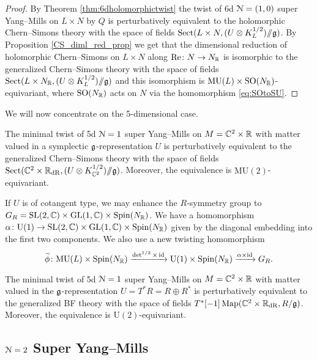 \documentclass[10pt, oneside]{article}
\newcommand{\MU}{\mathrm{MU}}
\renewcommand{\Re}{\mathrm{Re}}
\newcommand{\Sect}{\mathrm{Sect}}
\renewcommand{\U}{\mathrm{U}}
\newcommand{\ham}{/\!\!/}
\begin{document}
\begin{proof}
By Theorem \ref{thm:6dholomorphictwist} the twist of 6d $\mathcal N=(1, 0)$ super Yang--Mills on $L\times N$ by $Q$ is perturbatively equivalent to the holomorphic Chern--Simons theory with the space of fields $\Sect(L\times N, (U\otimes K_L^{1/2})\ham \fg)$. By Proposition \ref{CS_diml_red_prop} we get that the dimensional reduction of holomorphic Chern--Simons on $L\times N$ along $\Re\colon N\rightarrow N_\RR$ is isomorphic to the generalized Chern--Simons theory with the space of fields $\Sect(L\times N_\RR, (U\otimes K_L^{1/2})\ham\fg)$ and this isomorphism is $\MU(L)\times \SO(N_\RR)$-equivariant, where $\mathrm{SO}(N_\mathbb R)$ acts on $N$ via the homomorphism \eqref{eq:SOtoSU}.
\end{proof}

We will now concentrate on the 5-dimensional case.

\begin{theorem}
The minimal twist of 5d $\mathcal N=1$ super Yang--Mills on $M=\mathbb C^2\times \mathbb R$ with matter valued in a symplectic $\mathfrak g$-representation $U$ is perturbatively equivalent to the generalized Chern--Simons theory with the space of fields $\Sect(\CC^2\times \RR_{\mathrm{dR}}, (U\otimes K_{\CC^2}^{1/2})\ham \fg)$. Moreover, the equivalence is $\MU(2)$-equivariant.
\label{thm:5dminimaltwist}
\end{theorem}

If $U$ is of cotangent type, we may enhance the $R$-symmetry group to $G_R=\mathrm{SL}(2, \mathbb C)\times \mathrm{GL}(1, \mathbb C)\times \mathrm{Spin}(N_\mathbb R)$. We have a homomorphism $\alpha\colon \U(1)\rightarrow \SL(2, \CC)\times \GL(1, \CC)\times \Spin(N_\RR)$ given by the diagonal embedding into the first two components. We also use a new twisting homomorphism
\[\wt\phi\colon \MU(L)\times \Spin(N_\RR)\xrightarrow{\det^{1/2}\times \id}\U(1)\times \Spin(N_\RR)\xrightarrow{\alpha\times\id}G_R.\]

\begin{theorem}
The minimal twist of 5d $\mathcal N=1$ super Yang--Mills on $M=\mathbb C^2\times \mathbb R$ with matter valued in the $\mathfrak g$-representation $U=T^* R=R\oplus R^*$ is perturbatively equivalent to the generalized BF theory with the space of fields $T^*[-1]\operatorname{Map}(\mathbb C^2\times \mathbb R_{\mathrm{dR}}, R/\mathfrak g)$. Moreover, the equivalence is $\U(2)$-equivariant.
\label{thm:5dminimaltwistgraded}
\end{theorem}

\subsection{\texorpdfstring{$\mathcal{N} = 2$}{N=2} Super Yang--Mills} \label{5d_2_section}
\end{document}
